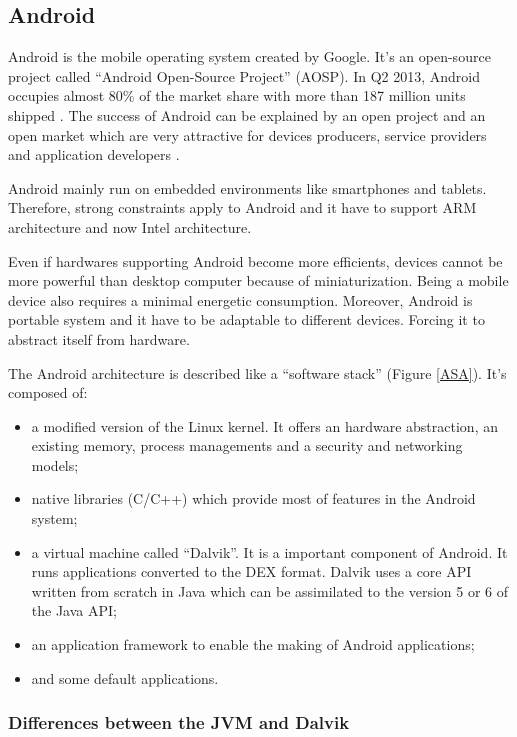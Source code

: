 \documentclass{sig-alternate}
\def \DALVIK{Dalvik\xspace}
\def \ANDROID{Android\xspace}
\def \DEX{DEX\xspace}
\begin{document}
  \subsection{Android}

    \ANDROID is the mobile operating system created by Google.
    It's an open-source project called ``\ANDROID Open-Source Project'' (AOSP).
    In Q2 2013, \ANDROID occupies almost 80\% of the market share with more than 187 million units shipped \cite{idc-website}.
    The success of \ANDROID can be explained by an open project and an open market
    which are very attractive for devices producers, service providers and application developers \cite{ieee-butler-android-landscape}.

    \ANDROID mainly run on embedded environments like smartphones and tablets.
    Therefore, strong constraints apply to \ANDROID
    and it have to support ARM architecture and now Intel architecture.
    
    Even if hardwares supporting \ANDROID become more efficients,
    devices cannot be more powerful than desktop computer because of miniaturization.
    Being a mobile device also requires a minimal energetic consumption.
    Moreover, \ANDROID is portable system and it have to be adaptable to different devices.
    Forcing it to abstract itself from hardware.

    The \ANDROID architecture is described like a ``software stack'' (Figure \ref{ASA}).
    It's composed of:
    \begin{itemize}
      \item a modified version of the Linux kernel.
        It offers an hardware abstraction, an existing memory, process managements and a security and networking models;
      \item native libraries (C/C++)
        which provide most of features in the \ANDROID system;
      \item a virtual machine called ``\DALVIK''.
        It is a important component of \ANDROID.
        It runs applications converted to the \DEX format.
        \DALVIK uses a core API written from scratch in Java
        which can be assimilated to the version 5 or 6 of the Java API;
      \item an application framework to enable the making of \ANDROID applications;
      \item and some default applications.
    \end{itemize}

    \subsubsection{Differences between the JVM and \DALVIK}
\end{document}

